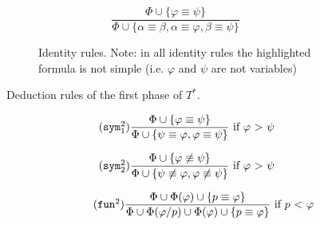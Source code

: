 \documentclass{article}
\theoremstyle{definition}
\newcommand*{\Ts}{T^*}
\newcommand*{\eq}{\equiv}
\begin{document}
\begin{figure}
\begin{subfigure}{\textwidth}
\begin{subfigure}{0.4\textwidth}
            \begin{equation}
                \tag{$ \eq$}
                \frac{
                    \Phi \cup \{ \varphi \eq \psi \} }%
                { \Phi \cup \{ \alpha \eq \beta, \alpha \eq \varphi, \beta \eq \psi \} }
            \end{equation}
        \end{subfigure}
        \caption{Identity rules. Note: in all identity rules the highlighted formula is not simple (i.e. $\varphi$ and $\psi$ are not variables)}
    \end{subfigure}
    \caption{Deduction rules of the first phase of $\Ts$.}
    \label{fig:rules1}
\end{figure}

\begin{figure}
    \begin{subfigure}{\textwidth}
        \centering
        \begin{subfigure}{0.4\textwidth}
            \begin{equation}
                \tag{$\texttt{sym}_1^2$}
                \frac{
                    \Phi \cup \{ \varphi \equiv \psi \} }%
                { \Phi \cup \{\psi \equiv \varphi, \varphi \eq \psi \} }
                \text{ if $\varphi$ > $\psi$}
            \end{equation}
        \end{subfigure}
        \begin{subfigure}{0.4\textwidth}
            \begin{equation}
                \tag{$\texttt{sym}_2^2$}
                \frac{
                    \Phi \cup \{ \varphi \not \equiv \psi \}}%
                { \Phi \cup \{\psi \not \equiv \varphi, \varphi \not \eq \psi\} }
                \text{ if $\varphi$ > $\psi$}
            \end{equation}
        \end{subfigure}
        \begin{subfigure}{0.55\textwidth}
            \begin{equation}
                \tag{$\texttt{fun}^2$}
                \frac{
                    \Phi \cup \Phi(\varphi) \cup \{ p \equiv \varphi \} }%
                { \Phi \cup \Phi(\varphi / p) \cup \Phi(\varphi) \cup \{p \equiv \varphi\} }
                \text{ if $p$ < $\varphi$}
            \end{equation}
        \end{subfigure}
    \end{subfigure}

\end{figure}
\end{document}
